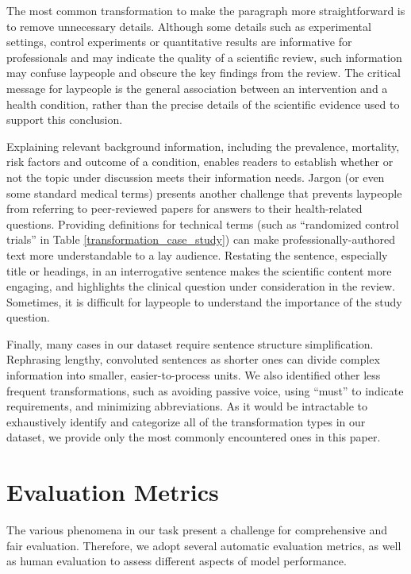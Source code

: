 \documentclass[letterpaper, table]{article}
\begin{document}
The most common transformation to make the paragraph more straightforward is to remove unnecessary details. Although some details such as experimental settings, control experiments or quantitative results are informative for professionals and may indicate the quality of a scientific review, such information
may confuse laypeople and obscure the key findings from the review.
The critical message for laypeople is the general association between an intervention and a health condition, rather than the precise details of the scientific evidence used to support this conclusion.

Explaining relevant background information, including the prevalence, mortality, risk factors and outcome of a condition, enables readers to establish whether or not the topic under discussion meets their information needs. Jargon (or even some standard medical terms) presents another challenge that prevents laypeople from referring to peer-reviewed papers for answers to their health-related questions. Providing definitions for technical terms (such as ``randomized control trials'' in Table \ref{transformation_case_study}) can make professionally-authored text more understandable to a lay audience. Restating the sentence, especially title or headings, in an interrogative sentence makes the scientific content more engaging, and highlights the clinical question under consideration in the review. Sometimes, it is difficult for laypeople to understand the importance of the study question.

Finally, many cases in our dataset require sentence structure simplification. Rephrasing lengthy, convoluted sentences as shorter ones can divide complex information into smaller, easier-to-process units. We also identified other less frequent transformations, such as avoiding passive voice, using ``must'' to indicate requirements, and minimizing abbreviations. As it would be intractable to exhaustively identify and categorize all of the transformation types in our dataset, we provide only the most commonly encountered ones in this paper.




\section{Evaluation Metrics}
\label{evaluation_metrics}

The various phenomena in our task present a challenge for comprehensive and fair evaluation. Therefore, we adopt several automatic evaluation metrics, as well as human evaluation to assess different aspects of model performance. %
\end{document}
